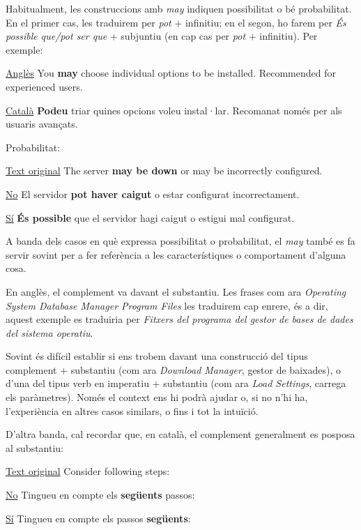 \documentclass[9pt]{cheatsheet}
\begin{document}
\begin{multicols*}{3}

Habitualment, les construccions amb \emph{may} indiquen possibilitat o bé probabilitat. En el primer cas, les traduirem per \emph{pot} + infinitiu; en el segon, ho farem per \emph{És possible que/pot ser que} + subjuntiu (en cap cas per \emph{pot} + infinitiu). Per exemple:

\underline {Anglès} You \textbf{may} choose individual options to be installed. Recommended for experienced users.

\underline {Català} \textbf{Podeu} triar quines opcions voleu instal·lar. Recomanat només per als usuaris avançats.

Probabilitat:

\underline {Text original} The server \textbf{may be down} or may be incorrectly configured.

\underline {No} El servidor \textbf{pot haver caigut} o estar configurat incorrectament.

\underline {Sí} \textbf{És possible} que el servidor hagi caigut o estigui mal configurat.

A banda dels casos en què expressa possibilitat o probabilitat, el \emph{may} també es fa servir sovint per a fer referència a les característiques o comportament d’alguna cosa.


En anglès, el complement va davant el substantiu. Les frases com ara \emph{Operating System Database Manager Program Files} les traduirem cap enrere, és a dir, aquest exemple es traduiria per \emph{Fitxers del programa del gestor de bases de dades del sistema operatiu}.

Sovint és difícil establir si ens trobem davant una construcció del tipus complement + substantiu (com ara \emph{Download Manager}, gestor de baixades), o d’una del tipus verb en imperatiu + substantiu (com ara \emph{Load Settings}, carrega els paràmetres). Només el context ens hi podrà ajudar o, si no n’hi ha, l’experiència en altres casos similars, o fins i tot la intuïció.

D’altra banda, cal recordar que, en català, el complement generalment es posposa al substantiu:

\underline {Text original} Consider following steps:

\underline {No} Tingueu en compte els \textbf{següents} passos:

\underline {Sí} Tingueu en compte els passos \textbf{següents}:



\end{multicols*}
\end{document}
